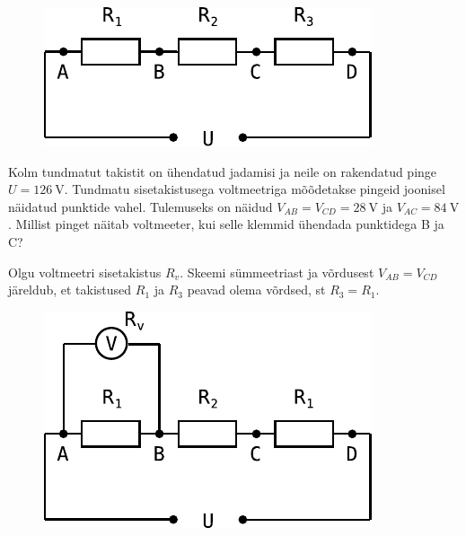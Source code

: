 
\begin{figure}
  \begin{center}
    \includegraphics[width=1\linewidth]{2023-v2g-07-yl.pdf}
  \end{center}
  \vspace{-2em}
\end{figure}

Kolm tundmatut takistit on ühendatud jadamisi ja neile on rakendatud pinge $U=\SI{126}{\volt}$. Tundmatu sisetakistusega voltmeetriga mõõdetakse pingeid joonisel näidatud punktide vahel. Tulemuseks on näidud $V_{AB}=V_{CD}=\SI{28}{\volt}$ ja $V_{AC}=\SI{84}{\volt}$. Millist pinget näitab voltmeeter, kui selle klemmid ühendada punktidega B ja C?




\hint

\solu
Olgu voltmeetri sisetakistus $R_v$. Skeemi sümmeetriast ja võrdusest $V_{AB}=V_{CD}$ järeldub, et takistused $R_1$ ja $R_3$ peavad olema võrdsed, st $R_3=R_1$. 

\begin{figure}
\vspace{-1em}
  \begin{center}
    \includegraphics[width=1\linewidth]{2023-v2g-07-yl1.pdf}
  \end{center}
\end{figure}


